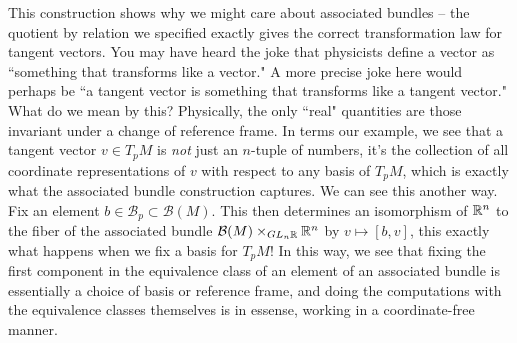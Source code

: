 \documentclass[abstract=on,twoside]{scrreprt}
\begin{document}
This construction shows why we might care about associated bundles -- the quotient by
relation we specified exactly gives the correct transformation law for tangent
vectors. You may have heard the joke that physicists define a vector as ``something
that transforms like a vector." A more precise joke here would perhaps be ``a tangent
vector is something that transforms like a tangent vector." What do we mean by this?
Physically, the only ``real" quantities are those invariant under a change of reference
frame. In terms our example, we see that a tangent vector $v \in T_pM$ is
\emph{not} just an $n$-tuple of numbers, it's the collection of all coordinate
representations of $v$ with respect to any basis of $T_pM$, which is exactly what
the associated bundle construction captures. We can see this another way. Fix
an element $b \in \mathcal{B}_p \subset \mathcal{B}(M)$. This then determines an
isomorphism of $\mathbb{R}^n$ to the fiber of the associated bundle
$\mathcal{B}(M) \times_{GL_n\mathbb{R}} \mathbb{R}^n$ by $v \mapsto [b,v]$, this exactly what happens
when we fix a basis for $T_pM$! In this way, we see that fixing the first component
in the equivalence class of an element of an associated bundle is essentially a
choice of basis or reference frame, and doing the computations with the equivalence
classes themselves is in essense, working in a coordinate-free manner. \\
\end{document}
